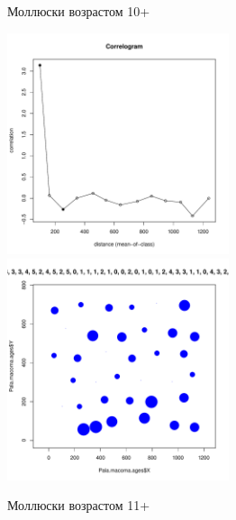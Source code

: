 \begin{figure}[h]
	\begin{minipage}[b]{\linewidth}
	\begin{center}
		Моллюски возрастом 10+
	\end{center}
	\end{minipage}

	\begin{minipage}[b]{.46\linewidth}
	\begin{center}
		\includegraphics[width=65mm]{../Barenc_Sea/distribution_Moran/Pala_macoma_age_N10_.pdf}
	\end{center}
	\end{minipage}
%
	\hfil %
%
	\begin{minipage}[b]{.46\linewidth}
	\begin{center}
		\includegraphics[width=65mm]{../Barenc_Sea/distribution_Moran/Pala_macoma_age_bubb_N10_.pdf}
	\end{center}
	\end{minipage}

	\begin{minipage}[b]{\linewidth}
	\begin{center}
		Моллюски возрастом 11+
	\end{center}
	\end{minipage}
	

\end{figure}
